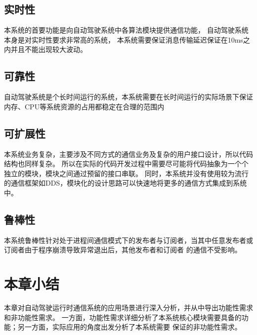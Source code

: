 \subsection{实时性}
本系统的首要功能是向自动驾驶系统中各算法模块提供通信功能，
自动驾驶系统本身是对实时性要求非常高的系统，
本系统需要保证消息传输延迟保证在10ms之内并且不能出现较大波动。

\subsection{可靠性}
自动驾驶系统是个长时间运行的系统，本系统需要在长时间运行的实际场景下保证内存、CPU等系统资源的占用都稳定在合理的范围内

\subsection{可扩展性}
本系统业务复杂，主要涉及不同方式的通信业务及复杂的用户接口设计，所以代码结构也同样复杂。
所以在实际的代码开发过程中需要尽可能将代码抽象为一个个独立的模块，模块之间通过预留的接口串联。
同时，本系统并没有使用较为流行的通信框架如DDS，模块化的设计思路可以快速地将更多的通信方式集成到系统中。

\subsection{鲁棒性}
本系统鲁棒性针对处于进程间通信模式下的发布者与订阅者，当其中任意发布者或订阅者由于程序崩溃导致异常退出后，其他发布者和订阅者
的通信不受影响。

\section{本章小结}
本章对自动驾驶运行时通信系统的应用场景进行深入分析，并从中导出功能性需求和非功能性需求。
一方面，功能性需求详细分析了本系统核心模块需要具备的功能；另一方面，实际应用的角度出发分析了本系统需要
保证的非功能性需求。








